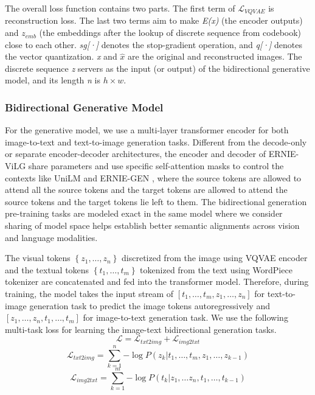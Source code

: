 \documentclass{article}
\begin{document}
The overall loss function contains two parts. The first term of $\mathcal{L}_{VQVAE}$ is reconstruction loss. The last two terms aim to make \textit{E(x)} (the encoder outputs) and $z_{emb}$ (the embeddings after the lookup of discrete sequence from codebook) close to each other.  \textit{sg[·]} denotes the stop-gradient operation, and \textit{q[·]} denotes the vector quantization. \textit{x} and $\hat{x}$ are the original and reconstructed images. The discrete sequence \textit{z} servers as the input (or output) of the bidirectional generative model, and its length \textit{n} is $h \times w$.

\subsubsection{Bidirectional Generative Model}
For the generative model, we use a multi-layer transformer encoder for both image-to-text and text-to-image generation tasks. 
Different from the decode-only \cite{ramesh2021zero, ding2021cogview} or separate encoder-decoder \cite{wu2021n} architectures, the encoder and decoder of ERNIE-ViLG share parameters and use specific self-attention masks to control the contexts like UniLM \cite{dong2019unilm} and ERNIE-GEN \cite{xiao2020ernie-gen}, where the source tokens are allowed to attend all the source tokens and the target tokens are allowed to attend the source tokens and the target tokens lie left to them. The bidirectional generation pre-training tasks are modeled exact in the same model where we consider sharing of model space helps establish better semantic alignments across vision and language modalities.

The visual tokens $\left\{z_1,…,z_n\right\}$ discretized from the image using VQVAE encoder and the textual tokens $\left\{t_1,…,t_m\right\}$ tokenized from the text using WordPiece tokenizer are concatenated and fed into the transformer model. Therefore, during training, the model takes the input stream of $[t_1,…,t_m,z_1,…,z_n]$ for text-to-image generation task to predict the image tokens autoregressively and $[z_1,…,z_n,t_1,…,t_m]$ for image-to-text generation task. 
We use the following multi-task loss for learning the image-text bidirectional generation tasks.
\begin{equation}
\mathcal{L}=\mathcal{L} _{txt2img} + \mathcal{L} _{img2txt} 
\end{equation}
\begin{equation}
\mathcal{L} _{txt2img} = \sum_{k=1}^{n}{-\log{P(z_k|t_1,…,t_m,z_1,…,z_{k-1})}}
\end{equation}
\begin{equation}
\mathcal{L} _{img2txt} = \sum_{k=1}^{m}{-\log{P(t_k|z_1,…z_n,t_1,…,t_{k-1})}}
\end{equation}
\end{document}
